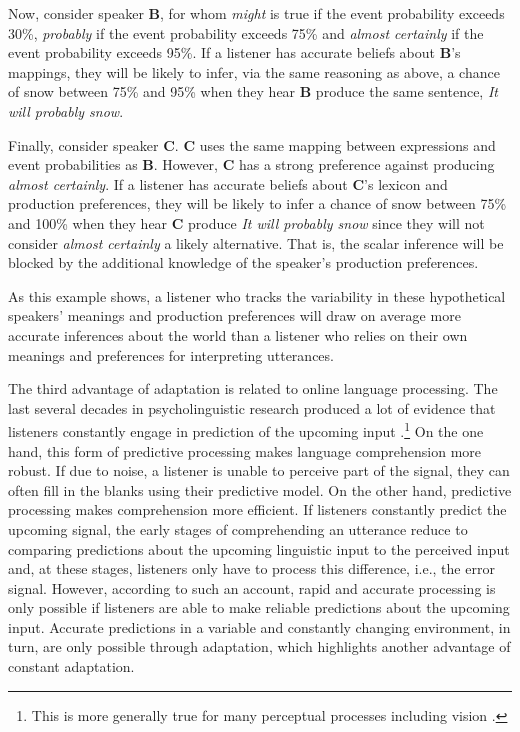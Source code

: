 Now, consider speaker {\bf B}, for whom \textit{might} is true if the event probability exceeds 30\%, 
\textit{probably} if the event probability exceeds 75\% and \textit{almost certainly}  if the event probability exceeds 95\%. If a listener has
accurate beliefs about {\bf B}'s mappings, they will be likely to infer, via the same reasoning as above, a chance of snow between 75\% and 95\% when they hear {\bf B} produce the same sentence, \textit{It will probably snow}.

Finally, consider speaker {\bf C}. {\bf C} uses the same mapping between expressions and event probabilities as {\bf B}. However, {\bf C} has a strong preference against 
producing \textit{almost certainly}. If a listener has accurate beliefs about {\bf C}'s lexicon and production preferences, 
they will be likely to infer a chance of snow between 75\% and 100\% when they hear {\bf C} produce \textit{It will probably snow} since they will not
consider  \textit{almost certainly} a likely alternative. That is, the scalar inference will be blocked by the additional knowledge of the speaker's production preferences. 

As this example shows, a listener who tracks the variability in these hypothetical speakers' meanings and production preferences 
will draw on average more accurate inferences about the world than a listener who relies on their own meanings and preferences
for interpreting utterances.

The third advantage of adaptation is related to online language processing. The last several decades
in psycholinguistic research produced a lot of evidence that listeners constantly engage in prediction of 
the upcoming input .\footnote{This is more generally true for many perceptual 
processes including vision \parencite[see, e.g.,][]{Clark2013,Friston2010}.} 
On the one hand, this form of predictive processing makes language comprehension more robust. If due to noise,
a listener is unable to perceive part of the signal, they can often fill in the blanks using their predictive model.
On the other hand, predictive processing makes comprehension more efficient. 
If listeners constantly predict the upcoming signal, the early stages of comprehending an utterance 
reduce to comparing predictions about the upcoming linguistic input to the perceived input and, at these stages, 
listeners only have to process this difference, i.e., the error signal. However, according to such an account,
rapid and accurate processing is only possible if listeners are able to make reliable predictions about the upcoming
input. Accurate predictions in a variable and constantly changing environment, in turn, are only possible through
 adaptation, which highlights another advantage of constant adaptation.

